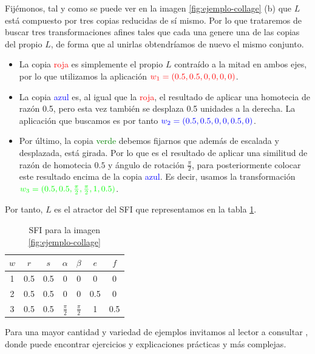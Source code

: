 \begin{ejemplo}
    Fijémonos, tal y como se puede ver en la imagen \ref{fig:ejemplo-collage} (b) que $L$ está compuesto por tres copias reducidas de sí mismo. Por lo que trataremos de buscar tres transformaciones afines tales que cada una genere una de las copias del propio $L$, de forma que al unirlas obtendríamos de nuevo el mismo conjunto.
    \begin{itemize}
        \item La copia \textcolor{red}{roja} es simplemente el propio $L$ contraído a la mitad en ambos ejes, por lo que utilizamos la aplicación $\textcolor{red}{w_1=(0.5,0.5,0,0,0,0)}$.
        \item La copia \textcolor{blue}{azul} es, al igual que la \textcolor{red}{roja}, el resultado de aplicar una homotecia de razón 0.5, pero esta vez también se desplaza 0.5 unidades a la derecha. La aplicación que buscamos es por tanto $\textcolor{blue}{w_2=(0.5,0.5,0,0,0.5,0)}$.
        \item Por último, la copia \textcolor{green}{verde} debemos fijarnos que además de escalada y desplazada, está girada. Por lo que es el resultado de aplicar una similitud de razón de homotecia $0.5$ y ángulo de rotación $\frac \pi 2$, para posteriormente colocar este resultado encima de la copia \textcolor{blue}{azul}. Es decir, usamos la transformación $\textcolor{green}{w_3=(0.5,0.5,\frac{\pi}{2},\frac{\pi}{2},1,0.5)}$.
    \end{itemize}

    Por tanto, $L$ es el atractor del SFI que representamos en la tabla \ref{tabla:ejemplo-collage}.

    \begin{table}[ht]
        \centering
        \begin{tabular}{c|cccccc} \hline
        $w$ & $r$ & $s$ & $\alpha$ & $\beta$ & $e$ & $f$ \\ \hline\hline
        1 & 0.5 & 0.5 & 0 & 0 & 0 & 0 \\ \hline
        2 & 0.5 & 0.5 & 0 & 0 & 0.5 & 0 \\ \hline
        3 & 0.5 & 0.5 & $\frac{\pi}{2}$ & $\frac{\pi}{2}$ & 1 &  0.5 \\ \hline
        \end{tabular}
        \caption{SFI para la imagen \ref{fig:ejemplo-collage}}
        \label{tabla:ejemplo-collage}
    \end{table}
\end{ejemplo}

Para una mayor cantidad y variedad de ejemplos invitamos al lector a consultar \cite[Sección 3.10]{Barnsley}, donde puede encontrar ejercicios y explicaciones prácticas y más complejas.

